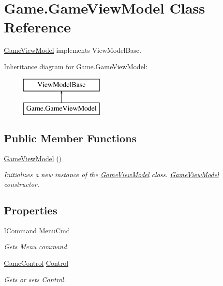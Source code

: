 \hypertarget{class_game_1_1_game_view_model}{}\section{Game.\+Game\+View\+Model Class Reference}
\label{class_game_1_1_game_view_model}


\mbox{\hyperlink{class_game_1_1_game_view_model}{Game\+View\+Model}} implements View\+Model\+Base.  


Inheritance diagram for Game.\+Game\+View\+Model\+:\begin{figure}[H]
\begin{center}
\leavevmode
\includegraphics[height=2.000000cm]{class_game_1_1_game_view_model}
\end{center}
\end{figure}
\subsection*{Public Member Functions}
\begin{DoxyCompactItemize}
\item 
\mbox{\hyperlink{class_game_1_1_game_view_model_a72f7732fb477a7b5bc78cf70e6fc56a6}{Game\+View\+Model}} ()
\begin{DoxyCompactList}\small\item\em Initializes a new instance of the \mbox{\hyperlink{class_game_1_1_game_view_model}{Game\+View\+Model}} class. \mbox{\hyperlink{class_game_1_1_game_view_model}{Game\+View\+Model}} constructor. \end{DoxyCompactList}\end{DoxyCompactItemize}
\subsection*{Properties}
\begin{DoxyCompactItemize}
\item 
I\+Command \mbox{\hyperlink{class_game_1_1_game_view_model_a56870b83795273e43f980ffaf4fef79a}{Menu\+Cmd}}
\begin{DoxyCompactList}\small\item\em Gets Menu command. \end{DoxyCompactList}\item 
\mbox{\hyperlink{class_game_1_1_game_control}{Game\+Control}} \mbox{\hyperlink{class_game_1_1_game_view_model_a2a9adca6708f57e91ede1202afeafd9d}{Control}}
\begin{DoxyCompactList}\small\item\em Gets or sets Control. \end{DoxyCompactList}\end{DoxyCompactItemize}


